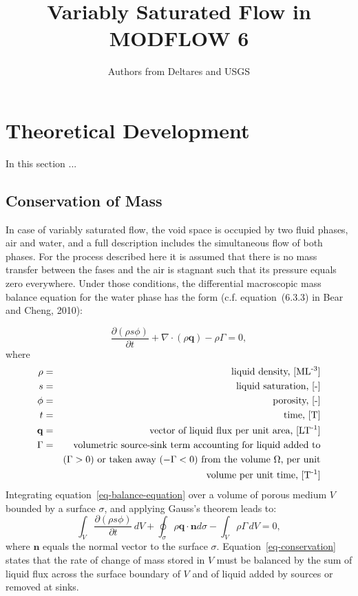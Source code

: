 \documentclass[fleqn]{article}
\author{Authors from Deltares and USGS}
\begin{document}
\title{Variably Saturated Flow in MODFLOW 6}
\maketitle

\tableofcontents

\section{Theoretical Development}
In this section ...

\subsection{Conservation of Mass}
In case of variably saturated flow, the void space is occupied by 
two fluid phases, air and water, and a full description includes
the simultaneous flow of both phases. For the process described here
it is assumed that there is no mass transfer between the fases and
the air is stagnant such that its pressure equals zero everywhere.
Under those conditions, the differential macroscopic mass balance 
equation for the water phase has the form (c.f. equation~(6.3.3)
in Bear and Cheng, 2010):

\begin{equation}
  \frac{\partial (\rho s \phi)}{\partial t} +
  \nabla \cdot (\rho \mathbf{q}) -
  \rho \Gamma = 0,
  \label{eq-balance-equation}
\end{equation}
where
\begin{eqnarray*}
  \rho &=& \textrm{liquid density, [ML\textsuperscript{-3}]} \\
  s &=& \textrm{liquid saturation, [-]} \\
  \phi &=& \textrm{porosity, [-]} \\
  t &=& \textrm{time, [T]} \\
  \mathbf{q} &=& \textrm{vector of liquid flux per unit area, [LT\textsuperscript{-1}]} \\
  \Gamma &=& \textrm{volumetric source-sink term accounting for liquid added to} \\
  && \textrm{($\Gamma > 0$) or taken away ($-\Gamma < 0$) from the volume $\Omega$, per unit} \\
  && \textrm{volume per unit time, [T\textsuperscript{-1}]}
\end{eqnarray*}
Integrating equation~\ref{eq-balance-equation} over a volume of porous
medium $V$ bounded by a surface $\sigma$, and applying Gauss's theorem
leads to:
\begin{equation}
  \int_V \frac{\partial (\rho s \phi)}{\partial t} \,dV +
  \oint_\sigma \rho \mathbf{q} \cdot \mathbf{n} d\sigma -
  \int_V \rho \Gamma \,dV = 0,
  \label{eq-conservation}
\end{equation}
where $\mathbf{n}$ equals the normal vector to the surface $\sigma$. 
Equation~\ref{eq-conservation} states that the rate of change of
mass stored in $V$ must be balanced by the sum of liquid flux across
the surface boundary of $V$ and of liquid added by sources or removed
at sinks.
\end{document}
